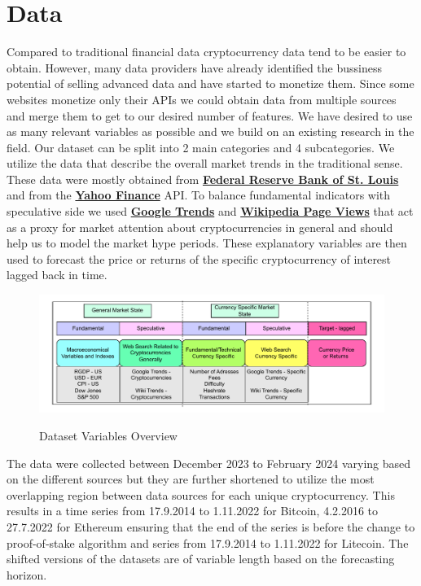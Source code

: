 \chapter{Data}
\label{chap:three}

Compared to traditional financial data cryptocurrency data tend to be easier
to obtain. However, many data providers have already identified the bussiness 
potential of selling advanced data and have started to monetize them. Since some
websites monetize only their APIs we could obtain data from 
multiple sources and merge them to get to our desired number of features. We have
desired to use as many relevant variables as possible and we build on
an existing research in the field.
Our dataset can be split into 2 main categories and 4 subcategories.
We utilize the data that describe the overall market trends in the traditional
sense. These data were mostly obtained from \textbf{\href{https://fred.stlouisfed.org/}{Federal Reserve Bank of St. Louis}}
and from the 
\textbf{\href{https://finance.yahoo.com/markets/}{Yahoo Finance}} API.
To balance fundamental indicators with speculative side we used \textbf{\href{https://trends.google.com/trends/}{Google Trends}}
and \textbf{\href{https://pageviews.wmcloud.org/}{Wikipedia Page Views}} 
that act as a proxy for market attention about cryptocurrencies in general 
and should help us to model the market hype periods. These explanatory
variables are then used to forecast the price or returns of the specific cryptocurrency
of interest lagged back in time.

\begin{figure}[!h]
    \centering
    \caption{Dataset Variables Overview}
        \includegraphics[width=1\textwidth]{Figures/dataset_description.drawio.pdf}
    \label{fig:dataset_description}
\end{figure}


The data were collected between December 2023 to February 2024 varying 
based on
the different sources but they are further shortened to utilize the most
overlapping region between data sources for each unique cryptocurrency.
This results in a time series from 17.9.2014 to 1.11.2022 for Bitcoin, 4.2.2016
to 27.7.2022 for Ethereum ensuring that the end of the series is 
before the change to proof-of-stake algorithm and series from 17.9.2014 to 1.11.2022
for Litecoin. The shifted versions of the datasets are of variable length based
on the forecasting horizon. 
